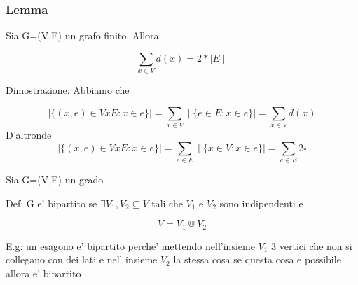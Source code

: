 \documentclass{article}
\begin{document}
        \subsubsection{Lemma}
        \begin{flushleft}
          Sia G=(V,E) un grafo finito. Allora:
        \end{flushleft}
        \begin{equation*}
          \sum_{x \in V} d(x)=2*\mid E \mid
        \end{equation*}
        \begin{flushleft}
          Dimostrazione: Abbiamo che
        \end{flushleft}
        \begin{equation*}
          \mid \{(x,e) \in VxE: x\in e\} \mid = \sum_{x \in V} \mid \{ e\in E: x\in e\} \mid = \sum_{x\in V} d(x)
        \end{equation*}
        D'altronde
        \begin{equation*}
          \mid \{(x,e) \in VxE: x\in e\} \mid = \sum_{e \in E} \mid \{x \in V: x\in e \} \mid = \sum_{e \in E} 2 \square
        \end{equation*}
        \begin{flushleft}
          Sia G=(V,E) un grado
        \end{flushleft}
        \begin{flushleft}
          Def: G e' bipartito se $\exists V_1,V_2 \subseteq V$ tali che $V_1$ e $V_2$ sono indipendenti e
        \end{flushleft}
        \begin{equation*}
          V=V_1 \Cup V_2
        \end{equation*}
        \begin{flushleft}
          E.g: un esagono e' bipartito perche' mettendo nell'insieme $V_1$ 3 vertici che non si collegano con dei lati e nell insieme $V_2$ la stessa cosa
          se questa cosa e possibile allora e' bipartito
        \end{flushleft}
\end{document}
